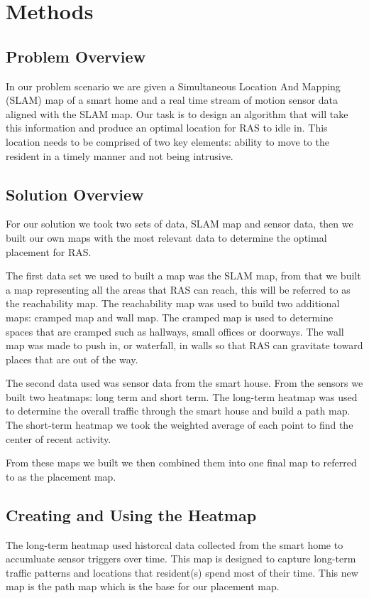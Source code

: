\documentclass[11pt, conference, a4paper]{IEEEtran}
\begin{document}
\section{Methods}


\subsection{Problem Overview}
In our problem scenario we are given a Simultaneous Location And Mapping (SLAM) map of a smart home and a real time stream of motion sensor data aligned with the SLAM map. Our task is to design an algorithm that will take this information and produce an optimal location for RAS to idle in. This location needs to be comprised of two key elements: ability to move to the resident in a timely manner and not being intrusive. 


\subsection{Solution Overview}
For our solution we took two sets of data, SLAM map and sensor data, then we built our own maps with the most relevant data to determine the optimal placement for RAS. 

The first data set we used to built a map was the SLAM map, from that we built a map representing all the areas that RAS can reach, this will be referred to as the reachability map. The reachability map was used to build two additional maps: cramped map and wall map. The cramped map is used to determine spaces that are cramped such as hallways, small offices or doorways. The wall map was made to push in, or waterfall, in walls so that RAS can gravitate toward places that are out of the way. 

The second data used was sensor data from the smart house. From the sensors we built two heatmaps: long term and short term. The long-term heatmap was used to determine the overall traffic through the smart house and build a path map. The short-term heatmap we took the weighted average of each point to find the center of recent activity.

From these maps we built we then combined them into one final map to referred to as the placement map. 


\subsection{Creating and Using the Heatmap}
The long-term heatmap used historcal data collected from the smart home to accumluate sensor triggers over time. This map is designed to capture long-term traffic patterns and locations that resident(s) spend most of their time. This new map is the path map which is the base for our placement map. 
\end{document}
